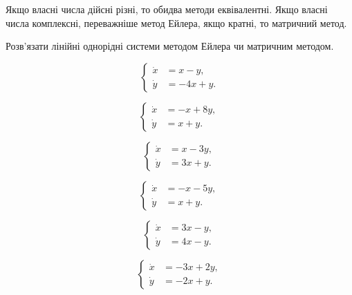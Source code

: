 \begin{remark}
    Якщо власні числа дійсні різні, то обидва методи еквівалентні. Якщо власні числа комплексні, переважніше метод Ейлера, якщо кратні, то матричний метод.
\end{remark}

Розв'язати лінійні однорідні системи методом Ейлера чи матричним методом.
\begin{multicols}{2}
    \begin{problem}
        \[ \left\{ \begin{aligned} 
            \dot x &= x - y, \\
            \dot y &= -4 x + y.
        \end{aligned} \right. \]
    \end{problem}
    
    \begin{problem}
        \[ \left\{ \begin{aligned} 
            \dot x &= -x + 8 y, \\
            \dot y &= x + y.
        \end{aligned} \right. \]
    \end{problem}
    
    \begin{problem}
        \[ \left\{ \begin{aligned} 
            \dot x &= x -3 y, \\
            \dot y &= 3 x + y.
        \end{aligned} \right. \]
    \end{problem}
    
    \begin{problem}
        \[ \left\{ \begin{aligned} 
            \dot x &= - x - 5 y, \\
            \dot y &= x + y.
        \end{aligned} \right. \]
    \end{problem}
    
    \begin{problem}
        \[ \left\{ \begin{aligned} 
            \dot x &= 3 x - y, \\
            \dot y &= 4 x - y.
        \end{aligned} \right. \]
    \end{problem}
    
    \begin{problem}
        \[ \left\{ \begin{aligned} 
            \dot x &= -3 x + 2 y, \\
            \dot y &= -2 x + y.
        \end{aligned} \right. \]
    \end{problem}
    

\end{multicols}
